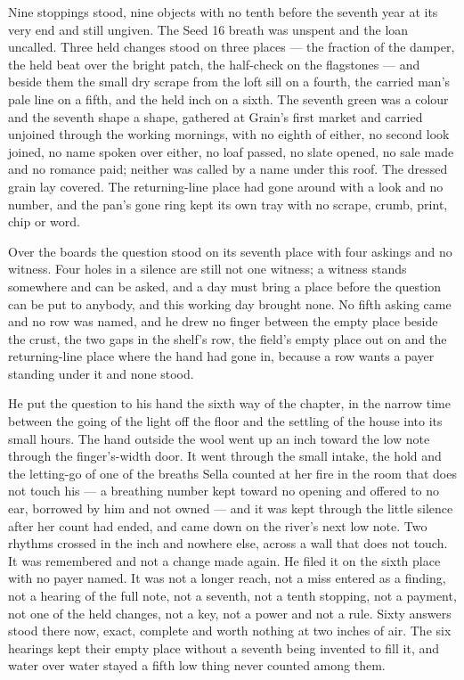 Nine stoppings stood, nine objects with no tenth before the seventh year at its very end and still ungiven. The Seed 16 breath was unspent and the loan uncalled. Three held changes stood on three places --- the fraction of the damper, the held beat over the bright patch, the half-check on the flagstones --- and beside them the small dry scrape from the loft sill on a fourth, the carried man's pale line on a fifth, and the held inch on a sixth. The seventh green was a colour and the seventh shape a shape, gathered at Grain's first market and carried unjoined through the working mornings, with no eighth of either, no second look joined, no name spoken over either, no loaf passed, no slate opened, no sale made and no romance paid; neither was called by a name under this roof. The dressed grain lay covered. The returning-line place had gone around with a look and no number, and the pan's gone ring kept its own tray with no scrape, crumb, print, chip or word.

Over the boards the question stood on its seventh place with four askings and no witness. Four holes in a silence are still not one witness; a witness stands somewhere and can be asked, and a day must bring a place before the question can be put to anybody, and this working day brought none. No fifth asking came and no row was named, and he drew no finger between the empty place beside the crust, the two gaps in the shelf's row, the field's empty place out on  and the returning-line place where the hand had gone in, because a row wants a payer standing under it and none stood.

He put the question to his hand the sixth way of the chapter, in the narrow time between the going of the light off the floor and the settling of the house into its small hours. The hand outside the wool went up an inch toward the low note through the finger's-width door. It went through the small intake, the hold and the letting-go of one of the breaths Sella counted at her fire in the room that does not touch his --- a breathing number kept toward no opening and offered to no ear, borrowed by him and not owned --- and it was kept through the little silence after her count had ended, and came down on the river's next low note. Two rhythms crossed in the inch and nowhere else, across a wall that does not touch. It was remembered and not a change made again. He filed it on the sixth place with no payer named. It was not a longer reach, not a miss entered as a finding, not a hearing of the full note, not a seventh, not a tenth stopping, not a payment, not one of the held changes, not a key, not a power and not a rule. Sixty answers stood there now, exact, complete and worth nothing at two inches of air. The six hearings kept their empty place without a seventh being invented to fill it, and water over water stayed a fifth low thing never counted among them.

